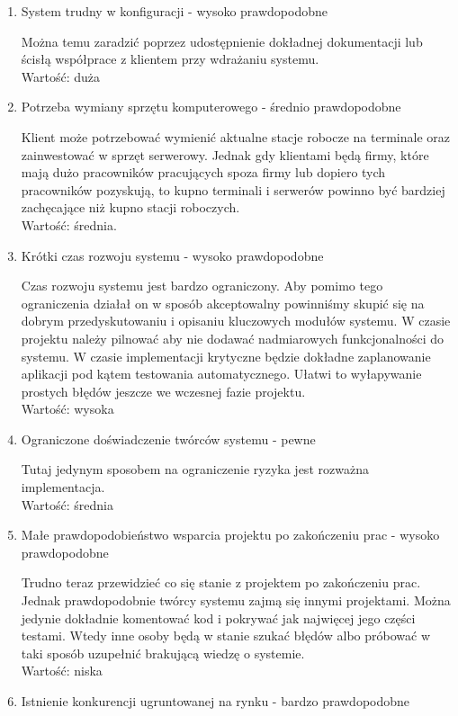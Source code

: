 \documentclass[12pt]{article}
\begin{document}
\begin{enumerate}
	\item System trudny w konfiguracji - wysoko prawdopodobne

	      Można temu zaradzić poprzez udostępnienie dokładnej dokumentacji lub ścisłą współprace z klientem przy wdrażaniu systemu. \\
	      Wartość: duża
	\item Potrzeba wymiany sprzętu komputerowego - średnio prawdopodobne

	      Klient może potrzebować wymienić aktualne stacje robocze na terminale oraz zainwestować w sprzęt serwerowy. Jednak gdy klientami będą firmy, które mają dużo pracowników pracujących spoza firmy lub dopiero tych pracowników pozyskują, to kupno terminali i serwerów powinno być bardziej zachęcające niż kupno stacji roboczych.\\
	      Wartość: średnia.
	\item Krótki czas rozwoju systemu - wysoko prawdopodobne

	      Czas rozwoju systemu jest bardzo ograniczony. Aby pomimo tego ograniczenia działał on w sposób akceptowalny powinniśmy skupić się na dobrym przedyskutowaniu i opisaniu kluczowych modułów systemu. W czasie projektu należy pilnować aby nie dodawać nadmiarowych funkcjonalności do systemu. W czasie implementacji krytyczne będzie dokładne zaplanowanie aplikacji pod kątem testowania automatycznego. Ułatwi to wyłapywanie prostych błędów jeszcze we wczesnej fazie projektu.\\
	      Wartość: wysoka
	      \newpage
	\item Ograniczone doświadczenie twórców systemu - pewne

	      Tutaj jedynym sposobem na ograniczenie ryzyka jest rozważna implementacja.\\
	      Wartość: średnia
	\item Małe prawdopodobieństwo wsparcia projektu po zakończeniu prac - wysoko prawdopodobne

	      Trudno teraz przewidzieć co się stanie z projektem po zakończeniu prac. Jednak prawdopodobnie twórcy systemu zajmą się innymi projektami. Można jedynie dokładnie komentować kod i pokrywać jak najwięcej jego części testami. Wtedy inne osoby będą w stanie szukać błędów albo próbować w taki sposób uzupełnić brakującą wiedzę o systemie.\\
	      Wartość: niska
	\item Istnienie konkurencji ugruntowanej na rynku - bardzo prawdopodobne


\end{enumerate}
\end{document}
